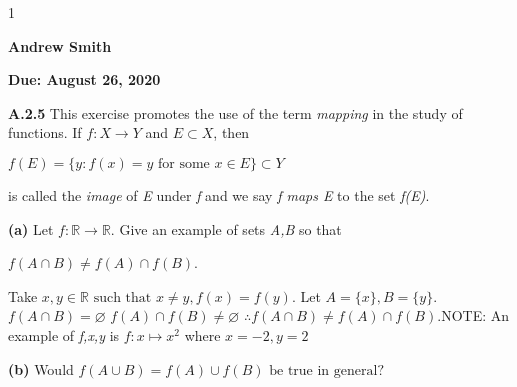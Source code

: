 \documentclass[12pt]{article}
\newcommand{\duedate}{August 26, 2020}
\newcommand{\yourname}{Andrew Smith}
\def\printsolutions{1}
\newcommand{\R}{\mathbb{R}}
\begin{document}
\if\printsolutions1
\begin{center}
\textbf{\Large \yourname}
\end{center}
\else
\begin{center}
\textbf{\Large Due: \duedate}
\end{center}
\fi


\begin{problem}\textbf{A.2.5} This exercise promotes the use of the term \textit{mapping} in the study of functions.\newline
If $f:X\to Y$ and $E\subset X$, then
\begin{center}
    $f(E)=\{y:f(x)=y\text{ for some }x\in E\}\subset Y$
\end{center}
is called the \textit{image} of \textit{E} under \textit{f} and we say \textit{f maps E} to the set \textit{f(E)}.
\end{problem}
\begin{subproblem}\textbf{(a)}
Let $f:\R\to\R$. Give an example of sets \textit{A,B} so that
\begin{center}
    $f(A\cap B)\neq f(A)\cap f(B)$.
\end{center}
\end{subproblem}

\begin{solution}\newline
Take $x,y\in\R\text{ such that }x\neq y,f(x)=f(y)$.\newline
Let $A=\{x\}, B=\{y\}$.\newline
$f(A\cap B)=\varnothing$\newline
$f(A)\cap f(B)\neq\varnothing$\newline
$\therefore f(A\cap B)\neq f(A)\cap f(B)$.\flushright NOTE: An example of \textit{f,x,y} is $f:x\mapsto x^2$ where $x=-2,y=2$
\end{solution}
\begin{subproblem}\textbf{(b)}
Would $f(A\cup B) = f(A)\cup f(B)\text{ be true in general?}$
\end{subproblem}
\end{document}
